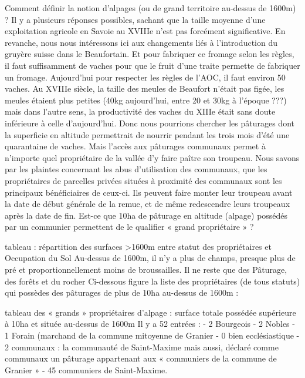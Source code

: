 \documentclass[12pt,a4paper]{report}
\begin{document}
	Comment définir la notion d’alpages (ou de grand territoire au-dessus de 1600m) ?
	Il y a plusieurs réponses possibles, sachant que la taille moyenne d’une exploitation agricole en Savoie au XVIIIe n’est pas forcément significative. En revanche, nous nous intéressons ici aux changements liés à l’introduction du gruyère suisse dans le Beaufortain. Et pour fabriquer ce fromage selon les règles, il faut suffisamment de vaches pour que le fruit d’une traite permette de fabriquer un fromage. Aujourd’hui pour respecter les règles de l’AOC, il faut environ 50 vaches. Au XVIIIe siècle, la taille des meules de Beaufort n’était pas figée, les meules étaient plus petites (40kg aujourd’hui, entre 20 et 30kg à l’époque ???) mais dans l’autre sens, la productivité des vaches du XIIIe était sans doute inférieure à celle d’aujourd’hui. Donc nous pourrions chercher les pâturages dont la superficie en altitude permettrait de nourrir pendant les trois mois d’été une quarantaine de vaches.
	Mais l’accès aux pâturages communaux permet à n’importe quel propriétaire de la vallée d’y faire paître son troupeau. Nous savons par les plaintes concernant les abus d’utilisation des communaux, que les propriétaires de parcelles privées situées à proximité des communaux sont les principaux bénéficiaires de ceux-ci. Ils peuvent faire monter leur troupeau avant la date de début générale de la remue, et de même redescendre leurs troupeaux après la date de fin.
	Est-ce que 10ha de pâturage en altitude (alpage) possédés par un communier permettent de le qualifier « grand propriétaire » ? 
	
	
	 tableau : répartition des surfaces >1600m entre statut des propriétaires et Occupation du Sol
	Au-dessus de 1600m, il n’y a plus de champs, presque plus de pré et proportionnellement moins de broussailles.
	Il ne reste que des Pâturage, des forêts et du rocher 
	Ci-dessous figure la liste des propriétaires (de tous statuts) qui possèdes des pâturages de plus de 10ha au-dessus de 1600m :
	
	tableau des « grands » propriétaires d’alpage : surface totale possédée supérieure à 10ha et située au-dessus de 1600m
	Il y a 52 entrées :
	-	2 Bourgeois
	-	2 Nobles
	-	1 Forain (marchand de la commune mitoyenne de Granier 
	-	0 bien ecclésiastique
	-	2 communaux : la communauté de Saint-Maxime mais aussi, déclaré comme communaux un pâturage appartenant aux « communiers de la commune de Granier »
	-	45 communiers de Saint-Maxime.
	
\end{document}

